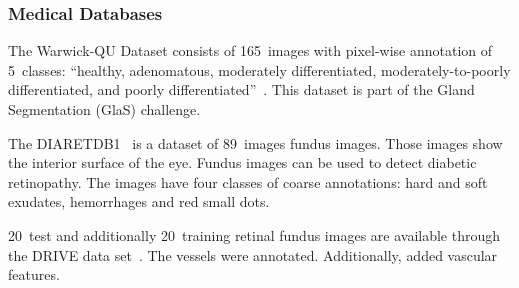 \subsubsection{Medical Databases}

The Warwick-QU Dataset consists of 165~images with pixel-wise annotation of
5~classes: \enquote{healthy, adenomatous, moderately differentiated,
moderately-to-poorly differentiated, and poorly
differentiated}~\cite{coelho2009nuclear}. This dataset is part of the
Gland Segmentation (GlaS) challenge.

The DIARETDB1~\cite{kalesnykiene2014diaretdb1} is a dataset of 89~images fundus
images. Those images show the interior surface of the eye. Fundus images can
be used to detect diabetic retinopathy. The images have four classes of coarse
annotations: hard and soft exudates, hemorrhages and red small dots.

20~test and additionally 20~training retinal fundus images are available
through the DRIVE data set~\cite{staal2004ridge}. The vessels were annotated.
Additionally, \cite{azzopardi2011detection} added vascular features.
